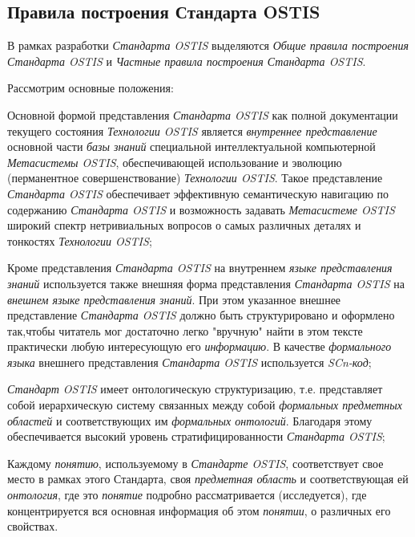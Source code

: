\subsection{Правила построения Стандарта OSTIS}

В рамках разработки \textit{Стандарта OSTIS} выделяются \textit{Общие правила построения Стандарта OSTIS} и \textit{Частные правила построения Стандарта OSTIS}.

\begin{SCn}
\end{SCn}

Рассмотрим основные положения:
\begin{textitemize}
	\item Основной формой представления \textit{Стандарта OSTIS} как полной документации текущего состояния \textit{Технологии OSTIS} является \textit{внутреннее представление} основной части \textit{базы знаний} специальной интеллектуальной компьютерной \textit{Метасистемы OSTIS}, обеспечивающей использование и эволюцию (перманентное совершенствование) \textit{Технологии OSTIS}. Такое представление \textit{Стандарта OSTIS} обеспечивает эффективную семантическую навигацию по содержанию \textit{Стандарта OSTIS} и возможность задавать \textit{Метасистеме OSTIS} широкий спектр нетривиальных вопросов о самых различных деталях и тонкостях \textit{Технологии OSTIS};
	\item Кроме представления \textit{Стандарта OSTIS} на внутреннем \textit{языке представления знаний} используется также внешняя форма представления \textit{Стандарта OSTIS} на \textit{внешнем языке представления знаний}. При этом указанное внешнее представление \textit{Стандарта OSTIS} должно быть структурировано и оформлено так,чтобы читатель мог достаточно легко "вручную"{} найти в этом тексте практически любую интересующую его \textit{информацию}. В качестве \textit{формального языка} внешнего представления \textit{Стандарта OSTIS} используется \textit{SCn-код};
	\item \textit{Стандарт OSTIS} имеет онтологическую структуризацию, т.е. представляет собой иерархическую систему связанных между собой \textit{формальных предметных областей} и соответствующих им \textit{формальных онтологий}.	Благодаря этому обеспечивается высокий уровень стратифицированности \textit{Стандарта OSTIS};
	\item Каждому \textit{понятию}, используемому в \textit{Стандарте OSTIS}, соответствует свое место в рамках этого Стандарта, своя \textit{предметная область} и соответствующая ей \textit{онтология}, где это \textit{понятие} подробно рассматривается (исследуется), где концентрируется вся основная информация об этом \textit{понятии}, о различных его свойствах.

\end{textitemize}
